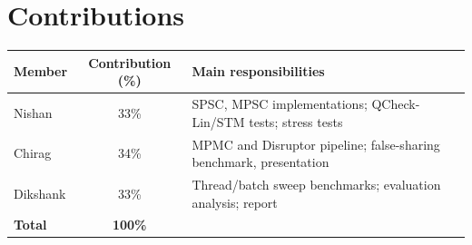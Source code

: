 \documentclass[11pt,a4paper]{article}
\begin{document}
\section*{Contributions}

\begin{center}
\begin{tabular}{@{}lcl@{}}
\toprule
\textbf{Member} & \textbf{Contribution (\%)} & \textbf{Main responsibilities} \\
\midrule
Nishan   & 33\% & SPSC, MPSC implementations; QCheck-Lin/STM tests; stress tests \\
Chirag   & 34\% & MPMC and Disruptor pipeline; false-sharing benchmark, presentation \\
Dikshank & 33\% & Thread/batch sweep benchmarks; evaluation analysis; report \\
\midrule
\textbf{Total} & \textbf{100\%} & \\
\bottomrule
\end{tabular}
\end{center}



\end{document}
